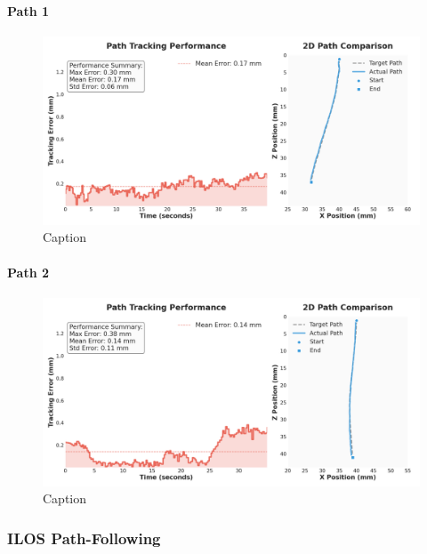 \paragraph*{Path 1}
\begin{figure} [H]
    \centering
    \includegraphics[width=\linewidth]{images/pathfollowing/LOS/longleft_250703_115622.png}
    \caption{Caption}
    \label{fig:enter-label}
\end{figure}

\paragraph*{Path 2}
\begin{figure} [H]
    \centering
    \includegraphics[width=\linewidth]{images/pathfollowing/LOS/twocurves_250630_171345.png}
    \caption{Caption}
    \label{fig:enter-label}
\end{figure}

\subsubsection{ILOS Path-Following}

